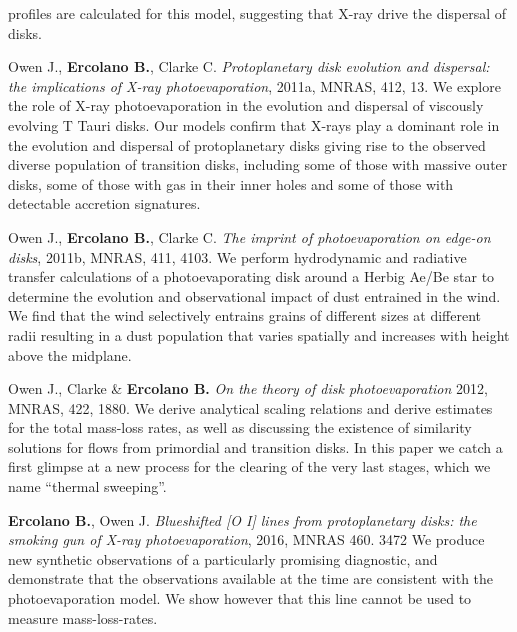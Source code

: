 \documentclass[10pt,fleqn,twoside]{article}
\begin{document}
\begin{literature}
profiles are calculated for this model, suggesting that X-ray drive
the dispersal of disks. 
\item Owen J., \textbf{Ercolano B.}, Clarke C.  \textit{
  Protoplanetary disk evolution and dispersal: the implications of X-ray photoevaporation}, 2011a, MNRAS, 412, 13.
  We explore the role of X-ray photoevaporation in the evolution and
  dispersal of viscously evolving T Tauri disks. Our models confirm
  that X-rays play a dominant role in the evolution and dispersal of
  protoplanetary disks giving rise to the observed diverse population
  of transition disks, including some of those with massive outer
  disks, some of those
  with gas in their inner holes and some of those with detectable accretion
  signatures.  
\item Owen J., \textbf{Ercolano B.}, Clarke C.  \textit{
    The imprint of photoevaporation on edge-on disks}, 2011b, MNRAS, 411, 4103.
  We perform hydrodynamic and radiative transfer calculations of a
  photoevaporating disk around a Herbig Ae/Be star to determine the
  evolution and observational impact of dust entrained in the wind. We
  find that the wind selectively entrains grains of different sizes at
  different radii resulting in a dust population that varies spatially
  and increases with height above the midplane.
\item Owen J., Clarke \& \textbf{Ercolano B.}  \textit{On the theory of disk photoevaporation}
  2012, MNRAS, 422, 1880. We derive analytical scaling relations and
  derive estimates for the total mass-loss rates, as well as
  discussing the existence of similarity solutions for flows from
  primordial and transition disks. In this paper we catch a first
  glimpse at a new process for the clearing of the very last stages,
  which we name ``thermal sweeping''.
\item \textbf{Ercolano B.}, Owen J.  {\em Blueshifted [O I] lines from
    protoplanetary disks: the smoking gun of X-ray photoevaporation},
  2016, MNRAS 460. 3472
  We produce new synthetic observations of a particularly promising
  diagnostic, and demonstrate that the observations available at the
  time \citep[before][]{2016ApJ...831..169S} are consistent with the
  photoevaporation model. We show however that this line cannot be
  used to measure mass-loss-rates. 
\end{literature}


%
%
%
%
%
%
%
\end{document}
